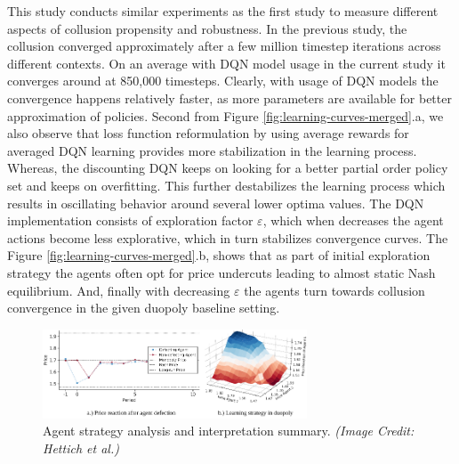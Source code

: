\documentclass{article}
\begin{document}
This study conducts similar experiments as the first study to measure different aspects of collusion propensity and robustness.
In the previous study, the collusion converged approximately after a few million timestep iterations across different contexts.
On an average with DQN model usage in the current study it converges around at 850,000 timesteps.
Clearly, with usage of DQN models the convergence happens relatively faster, as more parameters are available for better approximation of policies.
Second from Figure \ref{fig:learning-curves-merged}.a, we also observe that loss function reformulation by using average rewards for averaged DQN learning provides more stabilization in the learning process.
Whereas, the discounting DQN keeps on looking for a better partial order policy set and keeps on overfitting.
This further destabilizes the learning process which results in oscillating behavior around several lower optima values.
The DQN implementation consists of exploration factor $\varepsilon$, which when decreases the agent actions become less explorative, which in turn stabilizes convergence curves.
The Figure \ref{fig:learning-curves-merged}.b, shows that as part of initial exploration strategy the agents often opt for price undercuts leading to almost static Nash equilibrium.
And, finally with decreasing $\varepsilon$ the agents turn towards collusion convergence in the given duopoly baseline setting.


\begin{figure}[h]
    \centering
    \includegraphics[width=0.7\textwidth]{study-two/defection-strategy.png}
    \caption{Agent strategy analysis and interpretation summary. \textit{(Image Credit: Hettich et al.)}}
    \label{fig:defection-strategy}
\end{figure}
\end{document}
